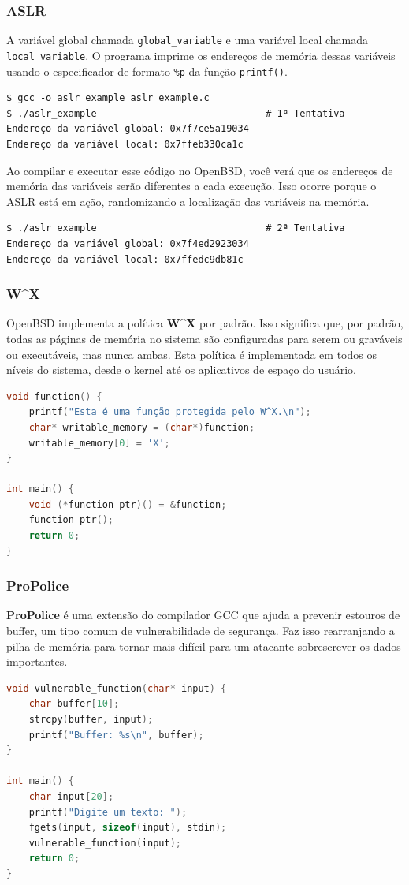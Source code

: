 \documentclass[9pt,xcolor=table]{beamer}
\begin{document}
\begin{frame}[fragile]
\frametitle{ASLR}
\justifying
A variável global chamada \verb|global_variable| e uma variável local chamada \verb|local_variable|. O programa imprime os endereços de memória dessas variáveis usando o especificador de formato \verb|%p| da função \verb|printf()|.

\begin{lstlisting}
$ gcc -o aslr_example aslr_example.c
$ ./aslr_example                              # 1ª Tentativa
Endereço da variável global: 0x7f7ce5a19034
Endereço da variável local: 0x7ffeb330ca1c
\end{lstlisting}
\vspace{0.1cm}
Ao compilar e executar esse código no OpenBSD, você verá que os endereços de memória das variáveis serão diferentes a cada execução. Isso ocorre porque o ASLR está em ação, randomizando a localização das variáveis na memória.
\begin{lstlisting}
$ ./aslr_example                              # 2ª Tentativa
Endereço da variável global: 0x7f4ed2923034
Endereço da variável local: 0x7ffedc9db81c
\end{lstlisting}
\end{frame}
\begin{frame}[fragile]
\frametitle{W\^{}X}
\justifying
OpenBSD implementa a política \textbf{W\^{}X} por padrão. Isso significa que, por padrão, todas as páginas de memória no sistema são configuradas para serem ou graváveis ou executáveis, mas nunca ambas. Esta política é implementada em todos os níveis do sistema, desde o kernel até os aplicativos de espaço do usuário.
\vspace{0.5cm }
\begin{lstlisting}[language=C]
void function() {
    printf("Esta é uma função protegida pelo W^X.\n");
    char* writable_memory = (char*)function;
    writable_memory[0] = 'X';
}

int main() {
    void (*function_ptr)() = &function;
    function_ptr();
    return 0;
}
\end{lstlisting}

\end{frame}
\begin{frame}[fragile]
\frametitle{ProPolice}
\justifying
\textbf{ProPolice} é uma extensão do compilador GCC que ajuda a prevenir estouros de buffer, um tipo comum de vulnerabilidade de segurança. Faz isso rearranjando a pilha de memória para tornar mais difícil para um atacante sobrescrever os dados importantes.
\vspace{0.5cm}
\begin{lstlisting}[language=C]
void vulnerable_function(char* input) {
    char buffer[10];
    strcpy(buffer, input);
    printf("Buffer: %s\n", buffer);
}

int main() {
    char input[20];
    printf("Digite um texto: ");
    fgets(input, sizeof(input), stdin);
    vulnerable_function(input);
    return 0;
}
\end{lstlisting}
\end{frame}
\end{document}

